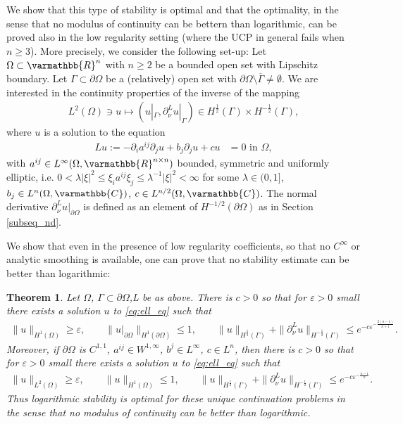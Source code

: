 \documentclass[12pt,twoside]{amsart}
\numberwithin{equation}{section}
\renewcommand{\leq}{\leqslant}
\renewcommand{\geq}{\geqslant}
\renewcommand{\mathbb}{\varmathbb}
\newtheorem{theorem}{Theorem}[section]
\newcommand {\R} {\mathbb{R}} \newcommand {\Z} {\mathbb{Z}}
\newcommand {\C} {\mathbb{C}} \newcommand {\Sn} {\mathbb{S}^n}
\newcommand {\p} {\partial}
\newcommand{\eps}{\varepsilon}
\begin{document}
We show that this type of stability is optimal and that the optimality, in the sense that no modulus of continuity can be bettern than logarithmic, can be proved also in the low regularity setting (where the UCP in general fails when $n \geq 3$). More precisely, we consider the following set-up:
Let $\Omega \subset \R^n$ with $n\geq 2$ be a bounded open set with Lipschitz boundary. Let $\Gamma \subset \partial \Omega$ be a (relatively) open set with $\p \Omega \setminus \overline{\Gamma} \neq \emptyset$. We are interested in the continuity properties of the inverse of the mapping
\begin{align*}
L^2(\Omega) \ni u \mapsto  (u|_{\Gamma}, \p_{\nu}^L u|_{\Gamma}) \in H^{\frac{1}{2}}(\Gamma) \times H^{-\frac{1}{2}}(\Gamma),
\end{align*}
where $u$ is a solution to the equation
\begin{align}
\label{eq:ell_eq}
Lu := -\p_i a^{ij} \p_j u + b_j \p_j u + c u & = 0 \text{ in $\Omega$},
\end{align}
with $a^{ij} \in L^{\infty}(\Omega, \R^{n\times n})$ bounded, symmetric and uniformly elliptic, i.e. $0<\lambda |\xi|^2 \leq \xi_i a^{ij } \xi_j \leq \lambda^{-1} |\xi|^2 < \infty$ for some $\lambda \in (0,1]$, $b_j \in L^n(\Omega, \C)$, $c \in L^{n/2}(\Omega, \C)$. The normal derivative $\p_{\nu}^L u|_{\p \Omega}$ is defined as an element of $H^{-1/2}(\p \Omega)$ as in Section \ref{subseq_nd}.


We show that even in the presence of low regularity coefficients, so that no $C^{\infty}$ or analytic smoothing is available, one can prove that no stability estimate can be better than logarithmic:



\begin{theorem}
\label{thm:UCP_instab}
Let $\Omega $, $\Gamma \subset \partial \Omega$,L be as above. There is $c > 0$ so that for $\eps > 0$ small there exists a solution $u$ to \eqref{eq:ell_eq} such that 
\begin{align*}
\|u\|_{H^1(\Omega)} \geq \eps, \qquad \|u|_{\p \Omega}\|_{H^{1}(\p \Omega)} \leq 1, \qquad \|u\|_{H^{\frac{1}{2}}(\Gamma)} + \|\p_{\nu}^L u\|_{H^{-\frac{1}{2}}(\Gamma)} \leq e^{-c \eps^{-\frac{2(n-1)}{n+1}}}.
\end{align*}
Moreover, if $\p \Omega$ is $C^{1,1}$, $a^{ij} \in W^{1,\infty}$, $b^j \in L^{\infty}$, $c \in L^n$, then there is $c > 0$ so that for $\eps > 0$ small there exists a solution $u$ to \eqref{eq:ell_eq} such that 
\begin{align*}
\|u\|_{L^{2}(\Omega)} \geq \eps, \qquad \|u\|_{H^{1}(\Omega)} \leq 1, \qquad \|u\|_{H^{\frac{1}{2}}(\Gamma)} + \|\p_{\nu}^L u\|_{H^{-\frac{1}{2}}(\Gamma)} \leq e^{-c \eps^{-\frac{n-1}{n}}}.
\end{align*}
Thus logarithmic stability is optimal for these unique continuation problems in the sense that no modulus of continuity can be better than logarithmic.
\end{theorem}
\end{document}
